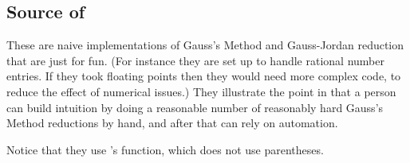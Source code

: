 \subsection{Source of \protect{}}

These are naive implementations of Gauss's Method and 
Gauss-Jordan reduction that are just for fun.
(For instance they are set up to handle rational number entries.
If they took floating points then they would need
more complex code, to reduce the effect of numerical issues.)
They illustrate the point 
in that a person can
build intuition by doing a reasonable number of reasonably hard Gauss's Method
reductions by hand, and after that can rely on automation.

Notice that they use 's  function, which
does not use parentheses. 


\endinput


TODO:
